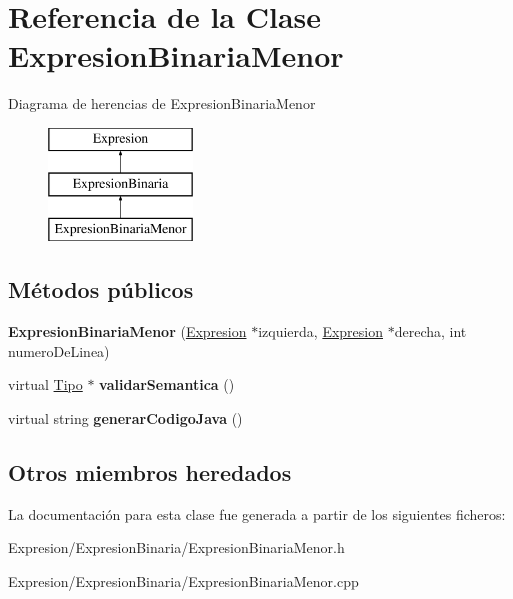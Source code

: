 \hypertarget{class_expresion_binaria_menor}{\section{Referencia de la Clase Expresion\-Binaria\-Menor}
\label{class_expresion_binaria_menor}
}
Diagrama de herencias de Expresion\-Binaria\-Menor\begin{figure}[H]
\begin{center}
\leavevmode
\includegraphics[height=3.000000cm]{class_expresion_binaria_menor}
\end{center}
\end{figure}
\subsection*{Métodos públicos}
\begin{DoxyCompactItemize}
\item 
\hypertarget{class_expresion_binaria_menor_aabf4f32a78741be4739f78ed10e82378}{{\bfseries Expresion\-Binaria\-Menor} (\hyperlink{class_expresion}{Expresion} $\ast$izquierda, \hyperlink{class_expresion}{Expresion} $\ast$derecha, int numero\-De\-Linea)}\label{class_expresion_binaria_menor_aabf4f32a78741be4739f78ed10e82378}

\item 
\hypertarget{class_expresion_binaria_menor_ac4062be428f8c03268aba3857099d5f5}{virtual \hyperlink{class_tipo}{Tipo} $\ast$ {\bfseries validar\-Semantica} ()}\label{class_expresion_binaria_menor_ac4062be428f8c03268aba3857099d5f5}

\item 
\hypertarget{class_expresion_binaria_menor_a86acaf9783a8735c35fc03d8a6eb064a}{virtual string {\bfseries generar\-Codigo\-Java} ()}\label{class_expresion_binaria_menor_a86acaf9783a8735c35fc03d8a6eb064a}

\end{DoxyCompactItemize}
\subsection*{Otros miembros heredados}


La documentación para esta clase fue generada a partir de los siguientes ficheros\-:\begin{DoxyCompactItemize}
\item 
Expresion/\-Expresion\-Binaria/Expresion\-Binaria\-Menor.\-h\item 
Expresion/\-Expresion\-Binaria/Expresion\-Binaria\-Menor.\-cpp\end{DoxyCompactItemize}
